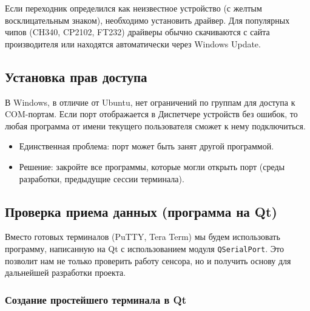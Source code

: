 \documentclass[12pt,a4paper]{article}
\begin{document}
\begin{tcolorbox}[colback=blue!5!white, colframe=blue!75!black, title=Примечание]
Если переходник определился как неизвестное устройство (с желтым восклицательным знаком), необходимо установить драйвер. Для популярных чипов (CH340, CP2102, FT232) драйверы обычно скачиваются с сайта производителя или находятся автоматически через Windows Update.
\end{tcolorbox}

\subsection{Установка прав доступа}
В Windows, в отличие от Ubuntu, нет ограничений по группам для доступа к COM-портам. Если порт отображается в Диспетчере устройств без ошибок, то любая программа от имени текущего пользователя сможет к нему подключиться.
\begin{itemize}
    \item Единственная проблема: порт может быть занят другой программой.
    \item Решение: закройте все программы, которые могли открыть порт (среды разработки, предыдущие сессии терминала).
\end{itemize}

\subsection{Проверка приема данных (программа на Qt)}

Вместо готовых терминалов (PuTTY, Tera Term) мы будем использовать программу, написанную на Qt с использованием модуля \texttt{QSerialPort}. Это позволит нам не только проверить работу сенсора, но и получить основу для дальнейшей разработки проекта.

\subsubsection*{Создание простейшего терминала в Qt}
\end{document}
